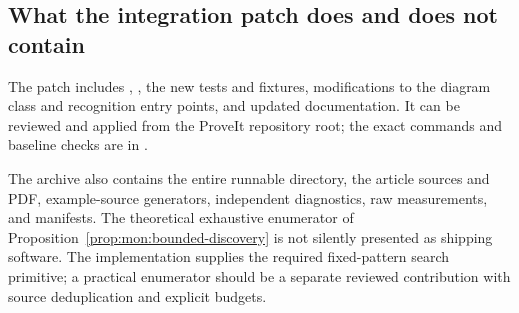 \subsection{What the integration patch does and does not contain}

The patch includes , ,
the new tests and fixtures, modifications to the diagram class and
recognition entry points, and updated documentation. It can be reviewed
and applied from the ProveIt repository root; the exact commands and
baseline checks are in .

The archive also contains the entire runnable  directory,
the article sources and PDF, example-source generators, independent
diagnostics, raw measurements, and manifests. The theoretical exhaustive
enumerator of Proposition~\ref{prop:mon:bounded-discovery} is not silently
presented as shipping software. The implementation supplies the required
fixed-pattern search primitive; a practical enumerator should be a separate
reviewed contribution with source deduplication and explicit budgets.
